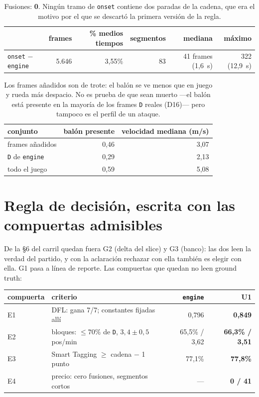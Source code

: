 \documentclass[11pt,a4paper]{article}
\newcommand{\code}[1]{\texttt{\small #1}}
\begin{document}
\begin{table}[h]
\centering
\small
\begin{tabular}{lrrrrr}
\toprule
 & frames & \% medios tiempos & segmentos & mediana & máximo \\
\midrule
\texttt{onset} $-$ \texttt{engine} & 5.646 & 3,55\% & 83 & 41 frames (1,6~s) & 322 (12,9~s) \\
\bottomrule
\end{tabular}
\caption{Fusiones: \textbf{0}. Ningún tramo de \texttt{onset} contiene dos paradas de la cadena, que
era el motivo por el que se descartó la primera versión de la regla.}
\end{table}

\begin{table}[h]
\centering
\small
\begin{tabular}{lrr}
\toprule
conjunto & balón presente & velocidad mediana (m/s) \\
\midrule
frames añadidos & 0,46 & 3,07 \\
\code{D} de \texttt{engine} & 0,29 & 2,13 \\
todo el juego & 0,59 & 5,08 \\
\bottomrule
\end{tabular}
\caption{Los frames añadidos son de trote: el balón se ve menos que en juego y rueda más despacio.
No es prueba de que sean muerto ---el balón está presente en la mayoría de los frames \code{D}
reales (D16)--- pero tampoco es el perfil de un ataque.}
\end{table}

\section{Regla de decisión, escrita con las compuertas admisibles}

De la §6 del carril quedan fuera G2 (delta del slice) y G3 (banco): las dos leen la verdad del
partido, y con la aclaración rechazar con ella también es elegir con ella. G1 pasa a línea de
reporte. Las compuertas que quedan no leen ground truth:

\begin{table}[h]
\centering
\small
\begin{tabular}{llrr}
\toprule
compuerta & criterio & \texttt{engine} & U1 \\
\midrule
E1 & DFL: gana 7/7; constantes fijadas allí & 0,796 & \textbf{0,849} \\
E2 & bloques: $\leq 70\%$ de \code{D}, $3{,}4 \pm 0{,}5$ pos/min & 65,5\% / 3,62 & \textbf{66,3\% / 3,51} \\
E3 & Smart Tagging $\geq$ cadena $-$ 1 punto & 77,1\% & \textbf{77,8\%} \\
E4 & precio: cero fusiones, segmentos cortos & --- & \textbf{0 / 41} \\
\bottomrule
\end{tabular}
\end{table}
\end{document}

